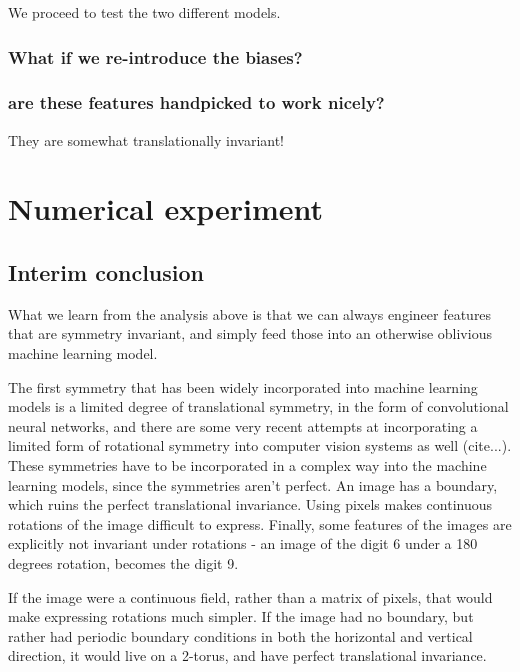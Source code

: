 \documentclass[twocolumn, prl]{revtex4-1}
\begin{document}
We proceed to test the two different models.

\subsubsection{What if we re-introduce the biases?}

\subsubsection{are these features handpicked to work nicely?}

They are somewhat translationally invariant!

\section{Numerical experiment}
\label{Sec:empirics}


\subsection{Interim conclusion}

What we learn from the analysis above is that we can always engineer features that are symmetry invariant, and simply feed those into an otherwise oblivious machine learning model.



The first symmetry that has been widely incorporated into machine learning models is a limited degree of translational symmetry, in the form of convolutional neural networks, and there are some very recent attempts at incorporating a limited form of rotational symmetry into computer vision systems as well (cite...). These symmetries have to be incorporated in a complex way into the machine learning models, since the symmetries aren't perfect. An image has a boundary, which ruins the perfect translational invariance. Using pixels makes continuous rotations of the image difficult to express. Finally, some features of the images are explicitly not invariant under rotations - an image of the digit 6 under a 180 degrees rotation, becomes the digit 9.

If the image were a continuous field, rather than a matrix of pixels, that would make expressing rotations much simpler. If the image had no boundary, but rather had periodic boundary conditions in both the horizontal and vertical direction, it would live on a 2-torus, and have perfect translational invariance.
\end{document}

